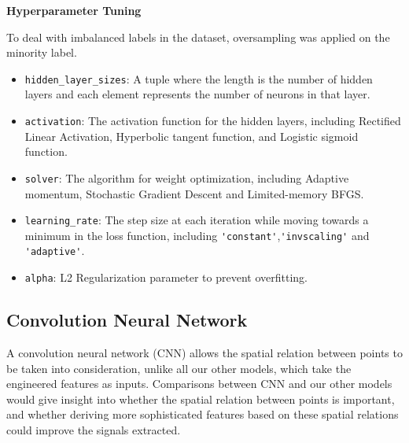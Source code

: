 \documentclass[a4paper,11pt]{report}
\begin{document}
\noindent\textbf{Hyperparameter Tuning}

To deal with imbalanced labels in the dataset, oversampling was applied on the minority label. 

\begin{itemize}
    \item \verb|hidden_layer_sizes|: A tuple where the length is the number of hidden layers and each element represents the number of neurons in that layer.
    \item \verb|activation|: The activation function for the hidden layers, including Rectified Linear Activation, Hyperbolic tangent function, and Logistic sigmoid function. 
    \item \verb|solver|: The algorithm for weight optimization, including Adaptive momentum, Stochastic Gradient Descent and Limited-memory BFGS.
    \item \verb|learning_rate|: The step size at each iteration while moving towards a minimum in the loss function, including \verb|'constant'|,\verb|'invscaling'| and \verb|'adaptive'|.
    \item \verb|alpha|: L2 Regularization parameter to prevent overfitting.
\end{itemize}

\subsection{Convolution Neural Network}
A convolution neural network (CNN) allows the spatial relation between points to be taken into consideration, unlike all our other models, which take the engineered features as inputs. Comparisons between CNN and our other models would give insight into whether the spatial relation between points is important, and whether deriving more sophisticated features based on these spatial relations could improve the signals extracted. 
\end{document}
